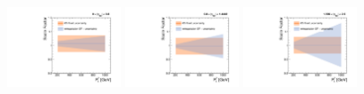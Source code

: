 \begin{figure}[!htbp]
  \includegraphics[width=0.3\textwidth]{fig/Extrapolate_2016_0_Compare.pdf}
  \includegraphics[width=0.3\textwidth]{fig/Extrapolate_2016_1_Compare.pdf}
  \includegraphics[width=0.3\textwidth]{fig/Extrapolate_2016_2_Compare.pdf}
  \label{fig:Extrapolation}
\end{figure}

